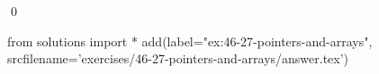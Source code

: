 
\begin{ex}
  \label{ex:46-27-pointers-and-arrays}
  
  \qed
\end{ex}
\begin{python0}
from solutions import *
add(label="ex:46-27-pointers-and-arrays",
    srcfilename='exercises/46-27-pointers-and-arrays/answer.tex')
\end{python0}
